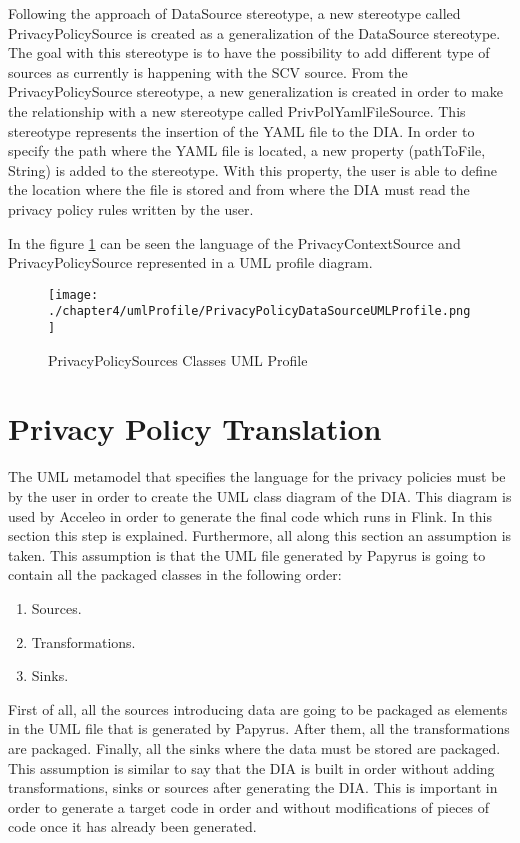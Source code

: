 Following the approach of DataSource stereotype, a new stereotype called PrivacyPolicySource is created as a generalization of the DataSource stereotype. The goal with this stereotype is to have the possibility to add different type of sources as currently is happening with the SCV source. From the PrivacyPolicySource stereotype, a new generalization is created in order to make the relationship with a new stereotype called PrivPolYamlFileSource. This stereotype represents the insertion of the YAML file to the DIA. In order to specify the path where the YAML file is located, a new property (pathToFile, String) is added to the stereotype. With this property, the user is able to define the location where the file is stored and from where the DIA must read the privacy policy rules written by the user.

In the figure \ref{fig:PrivacyPolicySources Classes UML Profile} can be seen the language of the PrivacyContextSource and PrivacyPolicySource represented in a UML profile diagram.

\begin{figure}
\centering
{\texttt{[image: ./chapter4/umlProfile/PrivacyPolicyDataSourceUMLProfile.png]}}
\caption{PrivacyPolicySources Classes UML Profile}
\label{fig:PrivacyPolicySources Classes UML Profile}
\end{figure}

\section{Privacy Policy Translation}

The UML metamodel that specifies the language for the privacy policies must be by the user in order to create the UML class diagram of the DIA. This diagram is used by Acceleo in order to generate the final code which runs in Flink. In this section this step is explained. Furthermore, all along this section an assumption is taken. This assumption is that the UML file generated by Papyrus is going to contain all the packaged classes in the following order:

\begin{enumerate}
\item Sources.
\item Transformations.
\item Sinks.
\end{enumerate}

First of all, all the sources introducing data are going to be packaged as elements in the UML file that is generated by Papyrus. After them, all the transformations are packaged. Finally, all the sinks where the data must be stored are packaged. This assumption is similar to say that the DIA is built in order without adding transformations, sinks or sources after generating the DIA. This is important in order to generate a target code in order and without modifications of pieces of code once it has already been generated.

